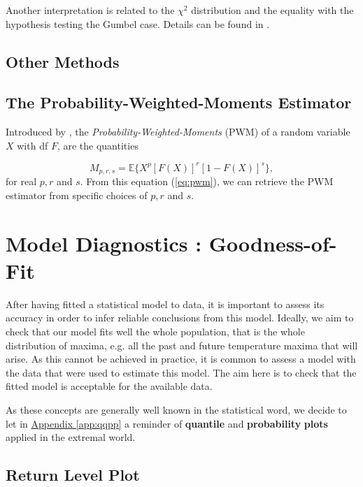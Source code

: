 Another interpretation is related to the $\chi^2$ distribution and the equality with the hypothesis testing the Gumbel case. Details can be found in \citet[pp.138]{beirlant_statistics_2006}.



\subsection{Other Methods}\label{sec:gevother}


\subsection*{The Probability-Weighted-Moments Estimator}

Introduced by \citet{greenwood_probability_1979}, the \emph{Probability-Weighted-Moments} (PWM) of a random variable $X$ with df $F$, are the quantities 

\begin{equation}\label{eq:pwm}
M_{p,r,s}=\mathbb{E}\Big\{X^p[F(X)]^r[1-F(X)]^s\Big\},
\end{equation}
for real $p,r$ and $s$. From this equation (\ref{eq:pwm}), we can retrieve the PWM estimator from specific choices of $p,r$ and $s$.



\section{Model Diagnostics : Goodness-of-Fit} 

After having fitted a statistical model to data, it is important to assess its accuracy in order to infer reliable conclusions from this model.
Ideally, we aim to check that our model fits well the whole population, that is the whole distribution of maxima, e.g. all the past and future temperature maxima that will arise. As this cannot be achieved in practice, it is common to assess a model with the data that were used to estimate this model. The aim here is to check that the fitted model is acceptable for the available data. 

As these concepts are generally well known in the statistical word, we decide to let in \hyperref[app:qqpp]{Appendix \ref{app:qqpp}} a reminder of \textbf{quantile} and \textbf{probability} \textbf{plots} applied in the extremal world.


\subsection{Return Level Plot}\label{rlplot}

